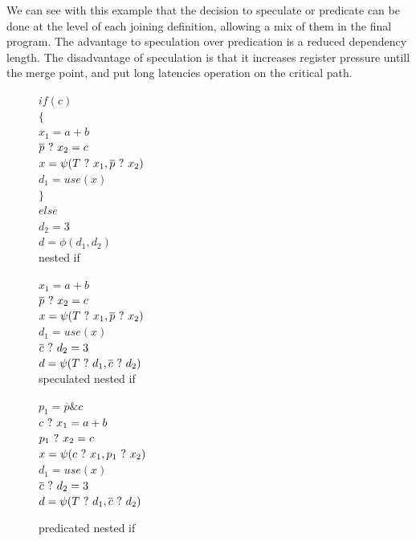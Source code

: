 We can see with this example that the decision to speculate or predicate can be done at the level of each joining definition, allowing a mix of them in the final program. The advantage to speculation over predication is a reduced dependency length. The disadvantage of speculation is that it increases register pressure untill the merge point, and put long latencies operation on the critical path.
 
\begin{figure}
\footnotesize
\begin{minipage}[b]{4cm}
$ if (c) $ \\
$ \{ $ \\
\hspace*{2mm}$ x_1 = a + b $ \\
\hspace*{2mm}$ \overline{p} ~?~ x_2 = c $ \\
\hspace*{2mm}$ x = \psi(T ~?~ x_1, \overline{p} ~?~ x_2) $ \\
\hspace*{2mm}$ d_1 = use (x) $ \\
$ \} $ \\
$ else $ \\
\hspace*{2mm}$ d_2 = 3 $ \\
$ d = \phi(d_1,d_2) $ \\
\caption{nested if}
\label{fig:nested_psi}
\end{minipage}
\begin{minipage}[b]{4cm}
$ x_1 = a + b $ \\
$ \overline{p} ~?~ x_2 = c $ \\
$ x = \psi(T ~?~ x_1, \overline{p} ~?~ x_2) $ \\
$ d_1 = use (x) $ \\
$ \overline{c} ~?~ d_2 = 3 $ \\
$ d = \psi(T ~?~ d_1, \overline{c} ~?~ d_2) $ \\
\caption{speculated nested if}
\label{fig:nested_psi_speculated}
\end{minipage}
\begin{minipage}[b]{4cm}
$ p_1 = \overline{p} \& {c} $ \\
$ c ~?~ x_1 = a + b $ \\
$ p_1 ~?~ x_2 = c $ \\
$ x = \psi(c ~?~ x_1, p_1 ~?~ x_2) $ \\
$ d_1 = use (x) $ \\
$ \overline{c} ~?~ d_2 = 3 $ \\
$ d = \psi(T ~?~ d_1, \overline{c} ~?~ d_2) $ \\
\caption{predicated nested if}
\label{fig:nested_psi_predicated}
\end{minipage}
\end{figure}

